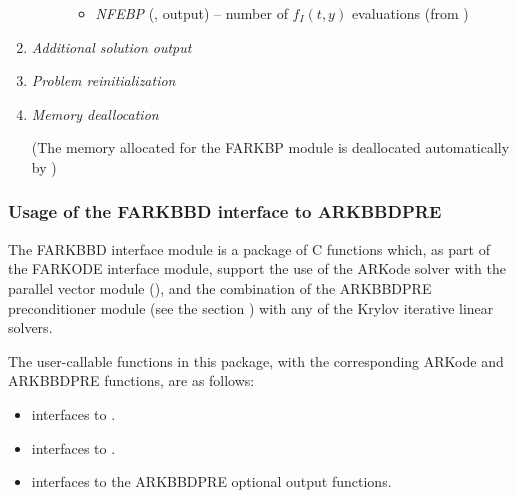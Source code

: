 \documentclass[letterpaper,10pt,english]{sphinxmanual}
\begin{document}
\begin{enumerate}
\begin{fulllineitems}
\begin{description}
\begin{itemize}
\item {} 
\emph{NFEBP} (, output) -- number of
\(f_I(t,y)\) evaluations (from
{\hyperref[c_interface/Preconditioners:c.ARKBandPrecGetNumRhsEvals]{\emph{}}})

\end{itemize}

\end{description}

\end{fulllineitems}


\item {} 
\emph{Additional solution output}

\item {} 
\emph{Problem reinitialization}

\item {} 
\emph{Memory deallocation}

(The memory allocated for the FARKBP module is deallocated
automatically by {\hyperref[f_interface/Usage:f/_/FARKFREE]{\emph{}}})

\end{enumerate}


\subsubsection{Usage of the FARKBBD interface to ARKBBDPRE}
\label{f_interface/Preconditioning:usage-of-the-farkbbd-interface-to-arkbbdpre}\label{f_interface/Preconditioning:finterface-bbdpre}
The FARKBBD interface module is a package of C functions which, as
part of the FARKODE interface module, support the use of the ARKode
solver with the parallel vector module ({\hyperref[nvectors/NVector_Parallel:nvectors-nvparallel]{\emph{}}}),
and the combination of the ARKBBDPRE preconditioner module (see the
section {\hyperref[c_interface/Preconditioners:cinterface-bbdpre]{\emph{}}}) with any of the Krylov iterative
linear solvers.

The user-callable functions in this package, with the corresponding
ARKode and ARKBBDPRE functions, are as follows:
\begin{itemize}
\item {} 
{\hyperref[f_interface/Preconditioning:f/_/FARKBBDINIT]{\emph{}}} interfaces to {\hyperref[c_interface/Preconditioners:c.ARKBBDPrecInit]{\emph{}}}.

\item {} 
{\hyperref[f_interface/Preconditioning:f/_/FARKBBDREINIT]{\emph{}}} interfaces to {\hyperref[c_interface/Preconditioners:c.ARKBBDPrecReInit]{\emph{}}}.

\item {} 
{\hyperref[f_interface/Preconditioning:f/_/FARKBBDOPT]{\emph{}}} interfaces to the ARKBBDPRE optional output
functions.

\end{itemize}
\end{document}
